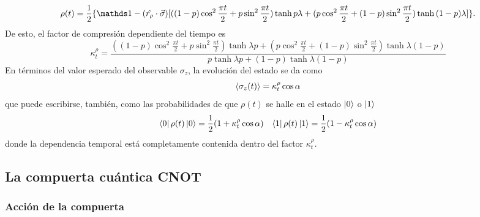 \begin{equation}
  \rho(t)=\frac{1}{2}\{\Id-(\hat{r_{\rho}}\cdot\vec{\sigma})[((1-p)\cos^{2}{\frac{\pi t}{2}}+p\sin^{2}{\frac{\pi t}{2}})\tanh{p\lambda}+(p\cos^{2}{\frac{\pi t}{2}}+(1-p)\sin^{2}{\frac{\pi t}{2}})\tanh{(1-p)\lambda}]\}.
\end{equation}
De esto, el factor de compresión dependiente del tiempo es
\begin{equation}\label{eq:SWAPFactort}
  \kappa_{t}^{\rho}=\frac{((1-p)\cos^{2}{\frac{\pi t}{2}}+p\sin^{2}{\frac{\pi t}{2}})\tanh{\lambda p}+(p\cos^{2}{\frac{\pi t}{2}}+(1-p)\sin^{2}{\frac{\pi t}{2}})\tanh{\lambda (1-p)}}{
    p\tanh{\lambda p}+(1-p)\tanh{\lambda (1-p)}}
\end{equation}
En términos del valor esperado del observable $\sigma_{z}$, la evolución del estado se da como
\begin{equation}
  \expval{\sigma_{z}(t)}=\kappa_{t}^{\rho}\cos{\alpha}
\end{equation}
que puede escribirse, también, como las probabilidades de que $\rho(t)$ se halle en el estado $\ket{0}$ o $\ket{1}$
 \begin{align}
  \bra{0}\rho(t)\ket{0}=\frac{1}{2}(1+\kappa_{t}^{\rho}\cos{\alpha}) && \bra{1}\rho(t)\ket{1}=\frac{1}{2}(1-\kappa_{t}^{\rho}\cos{\alpha})
 \end{align}
 donde la dependencia temporal está completamente contenida dentro del factor $\kappa_{t}^{\rho}$. 

\subsection{La compuerta cuántica CNOT}

\subsubsection{Acción de la compuerta}

